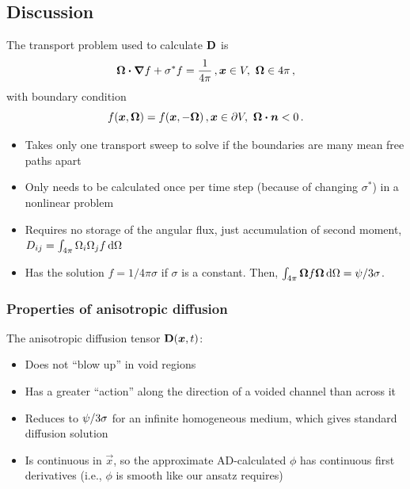\documentclass{beamer}
\begin{document}
\subsection{Discussion}
\begin{frame}
  The transport problem used to calculate $\mathbf{D}$ is
  \begin{equation*}
    \bm{\Omega}\bm{\cdot} \bm{\nabla} f + \sigma^* f = \frac{1}{4\pi} \,, \bm{x} \in V,\
    \bm{\Omega}\in 4\pi\,,
  \end{equation*}
  with boundary condition
  \begin{equation*}
    f(\bm{x}, \bm{\Omega}) = f(\bm{x}, -\bm{\Omega}) \,, \bm{x} \in
    \partial V,\ \bm{\Omega} \bm{\cdot} \bm{n} < 0\,.
  \end{equation*}
  \vspace{-\baselineskip}
  \begin{itemize}
    \item Takes only one transport sweep to solve if the boundaries are many
      mean free paths apart
    \item Only needs to be calculated once per time step (because of changing
      $\sigma^*$) in a nonlinear problem \item Requires no storage of the
      angular flux, just accumulation of second moment, $D_{ij} =
      \int_{4\pi} \Omega_i \Omega_j f \mathop{}\!\mathrm{d}\Omega$
    \item Has the solution $f=1/4\pi\sigma$ if $\sigma$ is a constant.
      Then, $\int_{4\pi} \bm{\Omega} f \bm{\Omega} \mathop{}\!\mathrm{d}\Omega =
      \mathbf{\psi}/3\sigma$.
  \end{itemize}
\end{frame}

\begin{frame}
  \frametitle{Properties of anisotropic diffusion}

  The anisotropic diffusion tensor $\mathbf{D}(\bm{x},t)$: 
  \begin{itemize}
    \item Does not ``blow up'' in void regions
    \item Has a greater ``action'' along the direction of a voided channel than
      across it
    \item Reduces to $\mathbf{\psi}/3\sigma$ for an infinite homogeneous
      medium, which gives standard diffusion solution
    \item Is continuous in $\vec{x}$, so the approximate AD-calculated $\phi$
      has continuous first derivatives (i.e., $\phi$ is smooth like our ansatz
      requires)
  \end{itemize}
\end{frame}
\end{document}
